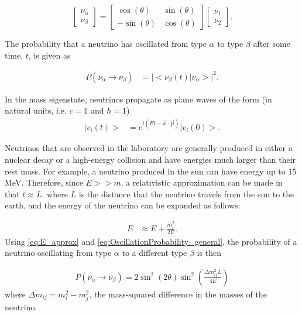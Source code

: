 \begin{equation}
\begin{bmatrix}
\nu_\alpha \\
\nu_\beta 
\end{bmatrix}
=
\begin{bmatrix}
\cos(\theta) & \sin(\theta) \\
-\sin(\theta) & \cos(\theta) 
\end{bmatrix}
\begin{bmatrix}
\nu_1 \\
\nu_2 
\end{bmatrix}.
\end{equation}

The probability that a neutrino has oscillated from type $\alpha$ to type $\beta$ after some time, $t$, is given as 

\begin{align}
P(\nu_\alpha\rightarrow\nu_\beta) &= \lvert<\nu_\beta(t)| \nu_\alpha>\rvert^2.
\end{align}

In the mass eigenstate, neutrinos propagate as plane waves of the form (in natural units, i.e. $c=1$ and $\hbar=1$)
\begin{align}
|v_i(t)>&=e^{i(Et-\vec{x}\cdot\vec{p})}|v_i(0)>.
\label{eq:OscillationProbability_general}
\end{align}

Neutrinos that are observed in the laboratory are generally produced in either a nuclear decay or a high-energy collision and have energies much larger than their rest mass. For example, a neutrino produced in the sun can have energy up to 15 MeV. Therefore, since $E >> m$, a relativistic approximation can be made in that $t\approx L$, where $L$ is the distance that the neutrino travels from the sun to the earth, and the energy of the neutrino can be expanded as follows:

\begin{align}
E &\approx E+\frac{m_i^2}{2E}.
\label{eq:E_approx}
\end{align}
Using \autoref{eq:E_approx} and \autoref{eq:OscillationProbability_general}, the probability of a neutrino oscillating from type $\alpha$ to a different type $\beta$ is then

\begin{align}
P(\nu_\alpha\rightarrow\nu_\beta) = 2 \sin^2(2\theta)\sin^2(\frac{\Delta m_{ij}^2L}{4E})
\label{eq:OscillationProbability_2nu}
\end{align}
where $\Delta m_{ij} = m_i^2 - m_j^2$, the mass-squared difference in the masses of the neutrino.
 
